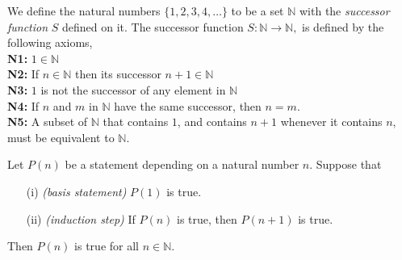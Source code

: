 \documentclass[../main.tex]{subfiles}
\begin{document}
\begin{definition}\label{def:natural numbers}
We define the natural numbers \( \{1, 2, 3, 4, \dots \} \) to be a set \(\mathbb{N}\) with the \textit{successor function} \(S\) defined on it. The successor function \(S:\mathbb{N} \rightarrow \mathbb{N},\) is defined by the following axioms,
\\ \indent \textbf{N1:} \( 1 \in \mathbb{N}\)
\\ \indent \textbf{N2:} If \(   n \in \mathbb{N}\) then its successor \( n+1 \in \mathbb{N}\) 
\\ \indent \textbf{N3:} \( 1\) is not the successor of any element in \(\mathbb{N}\)
\\ \indent \textbf{N4:} If \(n\) and \(m\) in \(\mathbb{N}\) have the same successor, then \(n=m\).
\\ \indent \textbf{N5:} A subset of \(\mathbb{N}\) that contains \(1\), and contains \(n+1\) whenever it contains \(n\), must be equivalent to \(\mathbb{N}\).

\end{definition}
























\begin{theorem}\label{thm:principle_of_induction}
Let \( P(n) \) be a statement depending on a natural number \( n \). Suppose that
\begin{itemize}
    \item[(i)] \textit{(basis statement)} \( P(1) \) is true.
    \item[(ii)] \textit{(induction step)} If \( P(n) \) is true, then \( P(n+1) \) is true.
\end{itemize}
Then \( P(n) \) is true for all \( n \in \mathbb{N} \).\\
\end{theorem}
\end{document}
